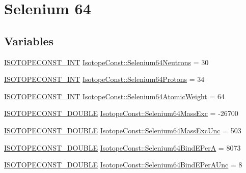 \hypertarget{group___isotope_const-_selenium-_se64}{}\section{Selenium 64}
\label{group___isotope_const-_selenium-_se64}
\subsection*{Variables}
\begin{DoxyCompactItemize}
\item 
\mbox{\hyperlink{group___isotope_const-_macros_ga5f18360b3e99483a35c32d789e62621c}{I\+S\+O\+T\+O\+P\+E\+C\+O\+N\+S\+T\+\_\+\+I\+NT}} \mbox{\hyperlink{group___isotope_const-_selenium-_se64_ga39947b122c9819b08ae02da890cb6043}{Isotope\+Const\+::\+Selenium64\+Neutrons}} = 30
\item 
\mbox{\hyperlink{group___isotope_const-_macros_ga5f18360b3e99483a35c32d789e62621c}{I\+S\+O\+T\+O\+P\+E\+C\+O\+N\+S\+T\+\_\+\+I\+NT}} \mbox{\hyperlink{group___isotope_const-_selenium-_se64_ga47498d75298e505775af78463e106aaa}{Isotope\+Const\+::\+Selenium64\+Protons}} = 34
\item 
\mbox{\hyperlink{group___isotope_const-_macros_ga5f18360b3e99483a35c32d789e62621c}{I\+S\+O\+T\+O\+P\+E\+C\+O\+N\+S\+T\+\_\+\+I\+NT}} \mbox{\hyperlink{group___isotope_const-_selenium-_se64_ga9c25ad9bc124c348a81db53fad4fbb5e}{Isotope\+Const\+::\+Selenium64\+Atomic\+Weight}} = 64
\item 
\mbox{\hyperlink{group___isotope_const-_macros_ga8f45a7272ce02c0b4c65c44636ed719a}{I\+S\+O\+T\+O\+P\+E\+C\+O\+N\+S\+T\+\_\+\+D\+O\+U\+B\+LE}} \mbox{\hyperlink{group___isotope_const-_selenium-_se64_gad31037ecbf26974fa366d0d923795f29}{Isotope\+Const\+::\+Selenium64\+Mass\+Exc}} = -\/26700
\item 
\mbox{\hyperlink{group___isotope_const-_macros_ga8f45a7272ce02c0b4c65c44636ed719a}{I\+S\+O\+T\+O\+P\+E\+C\+O\+N\+S\+T\+\_\+\+D\+O\+U\+B\+LE}} \mbox{\hyperlink{group___isotope_const-_selenium-_se64_ga88df6112cb352022e17eab0c3fd9a869}{Isotope\+Const\+::\+Selenium64\+Mass\+Exc\+Unc}} = 503
\item 
\mbox{\hyperlink{group___isotope_const-_macros_ga8f45a7272ce02c0b4c65c44636ed719a}{I\+S\+O\+T\+O\+P\+E\+C\+O\+N\+S\+T\+\_\+\+D\+O\+U\+B\+LE}} \mbox{\hyperlink{group___isotope_const-_selenium-_se64_gad17fce59ba76fabc9b5101330be461e6}{Isotope\+Const\+::\+Selenium64\+Bind\+E\+PerA}} = 8073
\item 
\mbox{\hyperlink{group___isotope_const-_macros_ga8f45a7272ce02c0b4c65c44636ed719a}{I\+S\+O\+T\+O\+P\+E\+C\+O\+N\+S\+T\+\_\+\+D\+O\+U\+B\+LE}} \mbox{\hyperlink{group___isotope_const-_selenium-_se64_gad4d2307480dbf832bcb880c080865702}{Isotope\+Const\+::\+Selenium64\+Bind\+E\+Per\+A\+Unc}} = 8

\end{DoxyCompactItemize}
